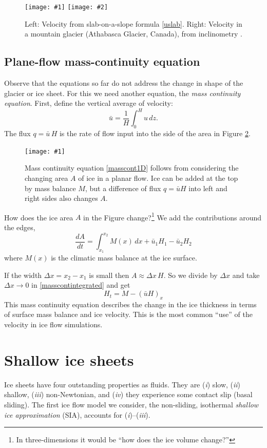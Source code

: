\documentclass[letterpaper,final,12pt,reqno]{amsart}
\newcommand{\onefigsize}[3]{
\begin{figure}[ht]
\centering
\texttt{[image: \#1]}
\caption{#2}
\label{fig:#1}
\end{figure}}
\newcommand{\twofigsizes}[5]{
\begin{figure}[ht]
\centering
\texttt{[image: \#1]} \quad
\texttt{[image: \#2]}
\caption{#3}
\label{fig:#1}
\end{figure}}
\begin{document}
\twofigsizes{slabvel}{athabasca_deform}{Left:  Velocity from slab-on-a-slope formula \eqref{uslab}.  Right:  Velocity in a mountain glacier (Athabasca Glacier, Canada), from inclinometry \cite{SavagePaterson}.}{2.0in}{1.8in}

\subsection*{Plane-flow mass-continuity equation}  Observe that the equations so far do not address the change in shape of the glacier or ice sheet.  For this we need another equation, the \emph{mass continuity equation}.  First, define the vertical average of velocity:
	$$\bar u = \frac{1}{H}\int_0^{H} u\,dz.$$
The flux $q=\bar u\, H$ is the rate of flow input into the side of the area in Figure \ref{fig:slabmasscontfig}.

\onefigsize{slabmasscontfig}{Mass continuity equation \eqref{masscont1D} follows from considering the changing area $A$ of ice in a planar flow.  Ice can be added at the top by mass balance $M$, but a difference of flux $q=\bar u H$ into left and right sides also changes $A$.}{2.5in}

How does the ice area $A$ in the Figure change?\footnote{In three-dimensions it would be ``how does the ice volume change?''}  We add the contributions around the edges,
\begin{equation}
\frac{dA}{dt} = \int_{x_1}^{x_2} M(x)\,dx + \bar u_1 H_1 - \bar u_2 H_2 \label{masscontintegrated}
\end{equation}
where $M(x)$ is the climatic mass balance at the ice surface.

If the width $\Delta x=x_2-x_1$ is small then $A\approx \Delta x\, H$.  So we divide by $\Delta x$ and take $\Delta x \to 0$ in \eqref{masscontintegrated} and get
\begin{equation}
H_t = M - \left(\bar u H\right)_x \label{masscont1D}
\end{equation}
This mass continuity equation describes the change in the ice thickness in terms of surface mass balance and ice velocity.  This is the most common ``use'' of the velocity in ice flow simulations.


\section{Shallow ice sheets}

Ice sheets have four outstanding properties as fluids.  They are (\emph{i}) slow, (\emph{ii}) shallow,  (\emph{iii}) non-Newtonian, and (\emph{iv}) they experience some contact slip (basal sliding).  The first ice flow model we consider, the non-sliding, isothermal \emph{shallow ice approximation} (SIA), accounts for (\emph{i})--(\emph{iii}).
\end{document}

